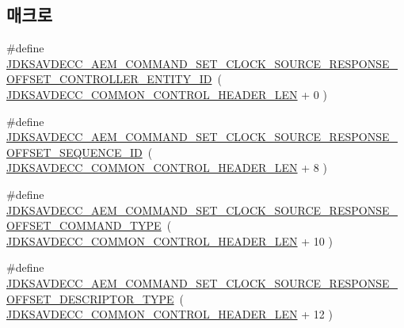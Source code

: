\subsection*{매크로}
\begin{DoxyCompactItemize}
\item 
\#define \hyperlink{group__command__set__clock__source__response_gabf1b87c53c2e41f739d19eb666428beb}{J\+D\+K\+S\+A\+V\+D\+E\+C\+C\+\_\+\+A\+E\+M\+\_\+\+C\+O\+M\+M\+A\+N\+D\+\_\+\+S\+E\+T\+\_\+\+C\+L\+O\+C\+K\+\_\+\+S\+O\+U\+R\+C\+E\+\_\+\+R\+E\+S\+P\+O\+N\+S\+E\+\_\+\+O\+F\+F\+S\+E\+T\+\_\+\+C\+O\+N\+T\+R\+O\+L\+L\+E\+R\+\_\+\+E\+N\+T\+I\+T\+Y\+\_\+\+ID}~( \hyperlink{group__jdksavdecc__avtp__common__control__header_gaae84052886fb1bb42f3bc5f85b741dff}{J\+D\+K\+S\+A\+V\+D\+E\+C\+C\+\_\+\+C\+O\+M\+M\+O\+N\+\_\+\+C\+O\+N\+T\+R\+O\+L\+\_\+\+H\+E\+A\+D\+E\+R\+\_\+\+L\+EN} + 0 )
\item 
\#define \hyperlink{group__command__set__clock__source__response_ga68c3093e1ed7c1fab25add08cd519869}{J\+D\+K\+S\+A\+V\+D\+E\+C\+C\+\_\+\+A\+E\+M\+\_\+\+C\+O\+M\+M\+A\+N\+D\+\_\+\+S\+E\+T\+\_\+\+C\+L\+O\+C\+K\+\_\+\+S\+O\+U\+R\+C\+E\+\_\+\+R\+E\+S\+P\+O\+N\+S\+E\+\_\+\+O\+F\+F\+S\+E\+T\+\_\+\+S\+E\+Q\+U\+E\+N\+C\+E\+\_\+\+ID}~( \hyperlink{group__jdksavdecc__avtp__common__control__header_gaae84052886fb1bb42f3bc5f85b741dff}{J\+D\+K\+S\+A\+V\+D\+E\+C\+C\+\_\+\+C\+O\+M\+M\+O\+N\+\_\+\+C\+O\+N\+T\+R\+O\+L\+\_\+\+H\+E\+A\+D\+E\+R\+\_\+\+L\+EN} + 8 )
\item 
\#define \hyperlink{group__command__set__clock__source__response_gabf3e86a4e0472a1dec8b99d2583dc008}{J\+D\+K\+S\+A\+V\+D\+E\+C\+C\+\_\+\+A\+E\+M\+\_\+\+C\+O\+M\+M\+A\+N\+D\+\_\+\+S\+E\+T\+\_\+\+C\+L\+O\+C\+K\+\_\+\+S\+O\+U\+R\+C\+E\+\_\+\+R\+E\+S\+P\+O\+N\+S\+E\+\_\+\+O\+F\+F\+S\+E\+T\+\_\+\+C\+O\+M\+M\+A\+N\+D\+\_\+\+T\+Y\+PE}~( \hyperlink{group__jdksavdecc__avtp__common__control__header_gaae84052886fb1bb42f3bc5f85b741dff}{J\+D\+K\+S\+A\+V\+D\+E\+C\+C\+\_\+\+C\+O\+M\+M\+O\+N\+\_\+\+C\+O\+N\+T\+R\+O\+L\+\_\+\+H\+E\+A\+D\+E\+R\+\_\+\+L\+EN} + 10 )
\item 
\#define \hyperlink{group__command__set__clock__source__response_gae9aedbbd181f8b1bf4ec0f1869719403}{J\+D\+K\+S\+A\+V\+D\+E\+C\+C\+\_\+\+A\+E\+M\+\_\+\+C\+O\+M\+M\+A\+N\+D\+\_\+\+S\+E\+T\+\_\+\+C\+L\+O\+C\+K\+\_\+\+S\+O\+U\+R\+C\+E\+\_\+\+R\+E\+S\+P\+O\+N\+S\+E\+\_\+\+O\+F\+F\+S\+E\+T\+\_\+\+D\+E\+S\+C\+R\+I\+P\+T\+O\+R\+\_\+\+T\+Y\+PE}~( \hyperlink{group__jdksavdecc__avtp__common__control__header_gaae84052886fb1bb42f3bc5f85b741dff}{J\+D\+K\+S\+A\+V\+D\+E\+C\+C\+\_\+\+C\+O\+M\+M\+O\+N\+\_\+\+C\+O\+N\+T\+R\+O\+L\+\_\+\+H\+E\+A\+D\+E\+R\+\_\+\+L\+EN} + 12 )

\end{DoxyCompactItemize}
